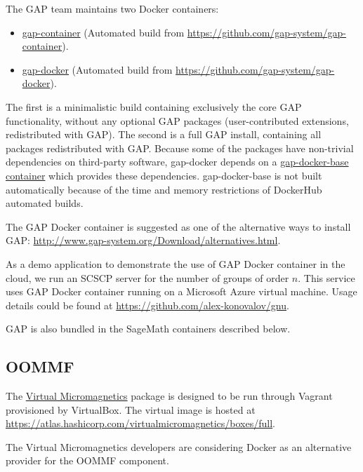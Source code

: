 The GAP team maintains two Docker containers:

\begin{itemize}
\tightlist
\item
  \href{https://hub.docker.com/r/gapsystem/gap-container/}{gap-container}
  (Automated build from \url{https://github.com/gap-system/gap-container}).
\item
  \href{https://hub.docker.com/r/gapsystem/gap-docker/}{gap-docker}
  (Automated build from \url{https://github.com/gap-system/gap-docker}).
\end{itemize}

The first is a minimalistic build containing exclusively the core GAP
functionality, without any optional GAP packages (user-contributed
extensions, redistributed with GAP). The second is a full GAP install,
containing all packages redistributed with GAP. Because some of the
packages have non-trivial dependencies on third-party software,
gap-docker depends on a
\href{https://hub.docker.com/r/gapsystem/gap-docker-base/}{gap-docker-base
container} which provides these dependencies. gap-docker-base is not
built automatically because of the time and memory restrictions of
DockerHub automated builds.

The GAP Docker container is suggested as one of the alternative ways to
install GAP: \url{http://www.gap-system.org/Download/alternatives.html}.

As a demo application to demonstrate the use of GAP Docker container in
the cloud, we run an SCSCP server for the number of groups of order
\(n\). This service uses GAP Docker container running on a Microsoft
Azure virtual machine. Usage details could be found at
\url{https://github.com/alex-konovalov/gnu}.

GAP is also bundled in the SageMath containers described below.

\subsection{OOMMF}\label{oommf}

The \href{http://fangohr.github.io/virtualmicromagnetics/}{Virtual
Micromagnetics} package is designed to be run through Vagrant
provisioned by VirtualBox. The virtual image is hosted at
\url{https://atlas.hashicorp.com/virtualmicromagnetics/boxes/full}.

The Virtual Micromagnetics developers are considering Docker as an
alternative provider for the OOMMF component.

